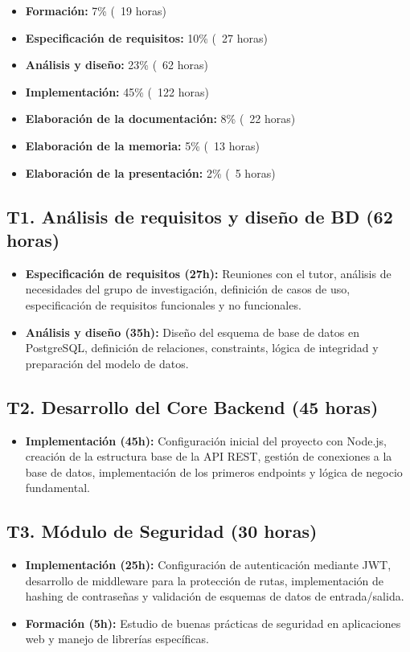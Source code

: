 \begin{itemize}
    \item \textbf{Formación:} 7\% (~19 horas)
    \item \textbf{Especificación de requisitos:} 10\% (~27 horas)
    \item \textbf{Análisis y diseño:} 23\% (~62 horas)
    \item \textbf{Implementación:} 45\% (~122 horas)
    \item \textbf{Elaboración de la documentación:} 8\% (~22 horas)
    \item \textbf{Elaboración de la memoria:} 5\% (~13 horas)
    \item \textbf{Elaboración de la presentación:} 2\% (~5 horas)
\end{itemize}

\subsection*{T1. Análisis de requisitos y diseño de BD (62 horas)}
\begin{itemize}
    \item \textbf{Especificación de requisitos (27h):} Reuniones con el tutor, análisis de necesidades del grupo de investigación, definición de casos de uso, especificación de requisitos funcionales y no funcionales.
    \item \textbf{Análisis y diseño (35h):} Diseño del esquema de base de datos en PostgreSQL, definición de relaciones, constraints, lógica de integridad y preparación del modelo de datos.
\end{itemize}

\subsection*{T2. Desarrollo del Core Backend (45 horas)}
\begin{itemize}
    \item \textbf{Implementación (45h):} Configuración inicial del proyecto con Node.js, creación de la estructura base de la API REST, gestión de conexiones a la base de datos, implementación de los primeros endpoints y lógica de negocio fundamental.
\end{itemize}

\subsection*{T3. Módulo de Seguridad (30 horas)}
\begin{itemize}
    \item \textbf{Implementación (25h):} Configuración de autenticación mediante JWT, desarrollo de middleware para la protección de rutas, implementación de hashing de contraseñas y validación de esquemas de datos de entrada/salida.
    \item \textbf{Formación (5h):} Estudio de buenas prácticas de seguridad en aplicaciones web y manejo de librerías específicas.
\end{itemize}

